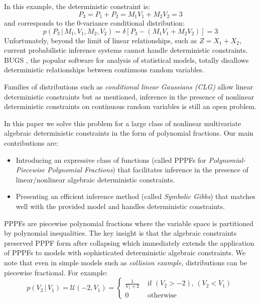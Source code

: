 \documentclass[letterpaper]{article}
\newcommand{\case}[2]{#2 &\text{ if } #1}%
\newcommand{\otherwise}[1]{#1 &\text{ otherwise}}
\newcommand{\pr}{p}
\begin{document}
In this example, the deterministic constraint is: 
{\footnotesize
\begin{equation}
\label{eq:moment-constraint}
P_3 = P_1 + P_2 = M_1 V_1 + M_2 V_2 = 3
\end{equation}
and corresponds to the 0-variance conditional distribution: 
$$
\pr(P_3 \,|\, M_1, V_1, M_2, V_2) = \delta[P_3 - (M_1 V_1 + M_2 V_2)] = 3
$$
}
Unfortunately, 
beyond the limit of linear relationships, such as $Z = X_1 + X_2$, 
current probabilistic inference systems cannot handle deterministic constraints.
BUGS \cite{lunn2009bugs}, the popular software for analysis of statistical models, 
totally disallows deterministic relationships between continuous random variables.

Families of distributions such as \emph{conditional linear Gaussians (CLG)} \cite{lauritzen2001stable}
allow linear deterministic constraints but as mentioned, inference in the presence of nonlinear deterministic constraints on continuous random variables is still an open problem.

In this paper we solve this problem for a large class of nonlinear multivariate algebraic deterministic constraints in the form of polynomial fractions. 
Our main contributions are:
\begin{itemize}
\item Introducing  an expressive class of functions 
(called PPPFs for \emph{Polynomial-Piecewise Polynomial Fractions}) that facilitates inference in the presence of  linear/nonlinear algebraic deterministic constraints.
\item Presenting an efficient inference method (called \emph{Symbolic Gibbs}) that matches well with the provided model and handles deterministic constraints.  
\end{itemize}

PPPFs are piecewise polynomial fractions where the variable space is partitioned by polynomial inequalities.
The key insight is that the algebraic constraints preserved PPPF form after collapsing which immediately extends the application of PPPFs to models with sophisticated deterministic algebraic constraints. 
We note that 
even in simple models such as \emph{collision example}, distributions can be piecewise fractional. 
For example:  
\[
\pr(V_2 \,|\, V_1) = \mathcal{U}(-2, V_1)
=
\begin{cases}
  \case{\scriptstyle (V_2 > -2), \, (V_2 < V_1)}{\frac{1}{V_1 + 2}}\\
 \otherwise{0}
 \end{cases}
\]
\end{document}
